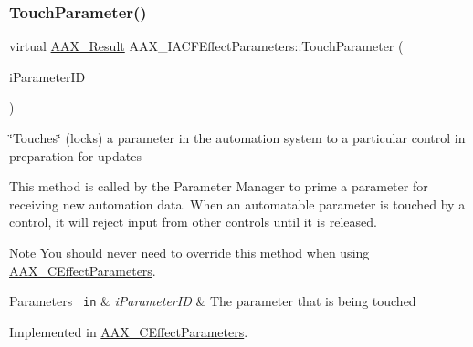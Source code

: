 \mbox{\label{a01669_ae82e80cbfd9cb837f8101a85f06856ba}} 
\subsubsection{\texorpdfstring{TouchParameter()}{TouchParameter()}}
{\footnotesize\ttfamily virtual \mbox{\hyperlink{a00392_a4d8f69a697df7f70c3a8e9b8ee130d2f}{A\+A\+X\+\_\+\+Result}} A\+A\+X\+\_\+\+I\+A\+C\+F\+Effect\+Parameters\+::\+Touch\+Parameter (\begin{DoxyParamCaption}\item[{\mbox{\hyperlink{a00392_a1440c756fe5cb158b78193b2fc1780d1}{A\+A\+X\+\_\+\+C\+Param\+ID}}}]{i\+Parameter\+ID }\end{DoxyParamCaption})\hspace{0.3cm}{\ttfamily [pure virtual]}}



\char`\"{}\+Touches\char`\"{} (locks) a parameter in the automation system to a particular control in preparation for updates 

This method is called by the Parameter Manager to prime a parameter for receiving new automation data. When an automatable parameter is touched by a control, it will reject input from other controls until it is released.

\begin{DoxyNote}{Note}
You should never need to override this method when using \mbox{\hyperlink{a01481}{A\+A\+X\+\_\+\+C\+Effect\+Parameters}}.
\end{DoxyNote}

\begin{DoxyParams}[1]{Parameters}
\mbox{\texttt{ in}}  & {\em i\+Parameter\+ID} & The parameter that is being touched \\
\hline
\end{DoxyParams}


Implemented in \mbox{\hyperlink{a01481_a0c7e32833e98facec61b73ac25049b13}{A\+A\+X\+\_\+\+C\+Effect\+Parameters}}.

\mbox{\label{a01669_a2caf1b7b8e2dad62cf96f144479dee60}} 
